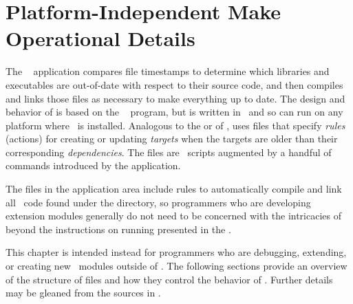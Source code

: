 \chapter{Platform-Independent Make Operational Details}\label{sec:pimake}

The \OOMMF\  application compares
file timestamps to determine which libraries and executables are
out-of-date with respect to their source code, and then compiles and
links those files as necessary to make everything up to date. The design
and behavior of  is based on the
\Unix\  program, but  is
written in \Tcl\ and so can run on any platform where \Tcl\ is
installed. Analogous to the  or  of
,  uses  files that specify
\textit{rules} (actions) for creating or updating \textit{targets} when
the targets are older than their corresponding \textit{dependencies}.
The  files are \Tcl\ scripts augmented by a handful of
commands introduced by the  application.

The  files in the  application area include
rules to automatically compile and link all \Cplusplus\ code found under
the  directory, so programmers who are
developing  extension modules generally do not need to be
concerned with the intricacies of  beyond the instructions
on running  presented in the
.

This chapter is intended instead for programmers who are debugging,
extending, or creating new \OOMMF\ modules outside of
. The following sections provide an overview of
the structure of  files and how they control the
behavior of . Further details may be gleaned from the
 sources in .

